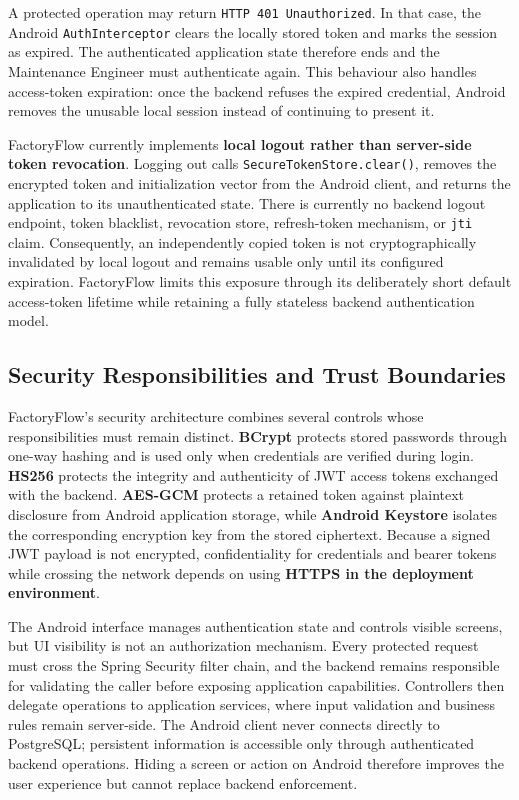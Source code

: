A protected operation may return \texttt{HTTP 401 Unauthorized}. In that case, the Android \texttt{AuthInterceptor} clears the locally stored token and marks the session as expired. The authenticated application state therefore ends and the Maintenance Engineer must authenticate again. This behaviour also handles access-token expiration: once the backend refuses the expired credential, Android removes the unusable local session instead of continuing to present it.

FactoryFlow currently implements \textbf{local logout rather than server-side token revocation}. Logging out calls \texttt{SecureTokenStore.clear()}, removes the encrypted token and initialization vector from the Android client, and returns the application to its unauthenticated state. There is currently no backend logout endpoint, token blacklist, revocation store, refresh-token mechanism, or \texttt{jti} claim. Consequently, an independently copied token is not cryptographically invalidated by local logout and remains usable only until its configured expiration. FactoryFlow limits this exposure through its deliberately short default access-token lifetime while retaining a fully stateless backend authentication model.


\subsection{Security Responsibilities and Trust Boundaries}
\label{subsec:security-responsibilities-trust-boundaries}

FactoryFlow's security architecture combines several controls whose responsibilities must remain distinct. \textbf{BCrypt} protects stored passwords through one-way hashing and is used only when credentials are verified during login. \textbf{HS256} protects the integrity and authenticity of JWT access tokens exchanged with the backend. \textbf{AES-GCM} protects a retained token against plaintext disclosure from Android application storage, while \textbf{Android Keystore} isolates the corresponding encryption key from the stored ciphertext. Because a signed JWT payload is not encrypted, confidentiality for credentials and bearer tokens while crossing the network depends on using \textbf{HTTPS in the deployment environment}.

The Android interface manages authentication state and controls visible screens, but UI visibility is not an authorization mechanism. Every protected request must cross the Spring Security filter chain, and the backend remains responsible for validating the caller before exposing application capabilities. Controllers then delegate operations to application services, where input validation and business rules remain server-side. The Android client never connects directly to PostgreSQL; persistent information is accessible only through authenticated backend operations. Hiding a screen or action on Android therefore improves the user experience but cannot replace backend enforcement.

